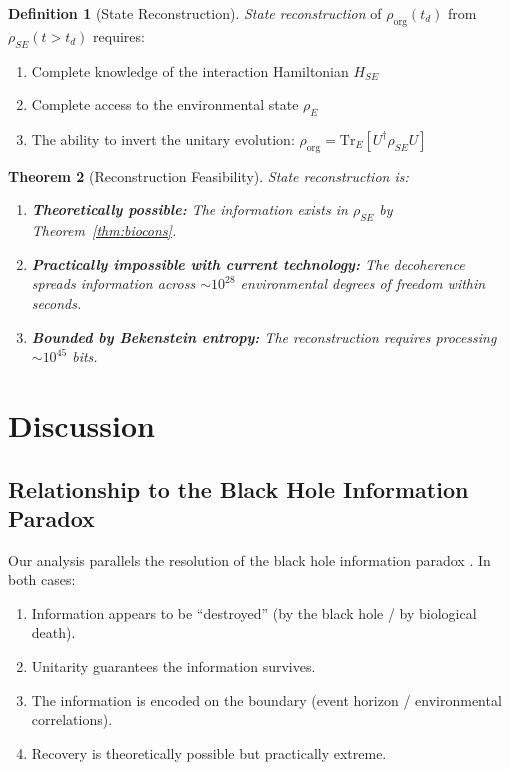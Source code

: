 \documentclass[12pt, a4paper]{article}
\theoremstyle{plain}
\newtheorem{theorem}{Theorem}[section]
\theoremstyle{definition}
\newtheorem{definition}[theorem]{Definition}
\begin{document}
\begin{definition}[State Reconstruction]\label{def:reconstruction}
  \emph{State reconstruction} of $\rho_{\text{org}}(t_d)$ from
  $\rho_{SE}(t > t_d)$ requires:
  \begin{enumerate}[label=(\roman*)]
    \item Complete knowledge of the interaction Hamiltonian $H_{SE}$
    \item Complete access to the environmental state $\rho_E$
    \item The ability to invert the unitary evolution:
      $\rho_{\text{org}} = \text{Tr}_E[U^\dagger \rho_{SE} U]$
  \end{enumerate}
\end{definition}

\begin{theorem}[Reconstruction Feasibility]\label{thm:reconstruction}
  State reconstruction is:
  \begin{enumerate}[label=(\alph*)]
    \item \textbf{Theoretically possible:} The information exists in
      $\rho_{SE}$ by Theorem~\ref{thm:biocons}.
    \item \textbf{Practically impossible with current technology:}
      The decoherence spreads information across $\sim 10^{28}$
      environmental degrees of freedom within seconds.
    \item \textbf{Bounded by Bekenstein entropy:} The reconstruction
      requires processing $\sim 10^{45}$ bits.
  \end{enumerate}
\end{theorem}

\section{Discussion}\label{sec:discussion}

\subsection{Relationship to the Black Hole Information Paradox}

Our analysis parallels the resolution of the black hole information
paradox \citep{Hawking2005}. In both cases:
\begin{enumerate}
  \item Information appears to be ``destroyed'' (by the black hole /
    by biological death).
  \item Unitarity guarantees the information survives.
  \item The information is encoded on the boundary (event horizon /
    environmental correlations).
  \item Recovery is theoretically possible but practically extreme.
\end{enumerate}
\end{document}
